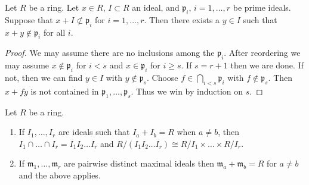 \begin{lemma}
\label{lemma-silly-silly}
Let $R$ be a ring. Let $x \in R$, $I \subset R$ an ideal, and
$\mathfrak p_i$, $i = 1, \ldots, r$ be prime ideals.
Suppose that $x + I \not \subset \mathfrak p_i$ for
$i = 1, \ldots, r$. Then there exists a $y \in I$
such that $x + y \not \in \mathfrak p_i$ for all $i$.
\end{lemma}

\begin{proof}
We may assume there are no inclusions among the $\mathfrak p_i$.
After reordering we may assume $x \not \in \mathfrak p_i$ for $i < s$
and $x \in \mathfrak p_i$ for $i \geq s$. If $s = r + 1$ then we are done.
If not, then we can find $y \in I$ with $y \not \in \mathfrak p_s$.
Choose $f \in \bigcap_{i < s} \mathfrak p_i$ with $f \not \in \mathfrak p_s$.
Then $x + fy$ is not contained in $\mathfrak p_1, \ldots, \mathfrak p_s$.
Thus we win by induction on $s$.
\end{proof}

\begin{lemma}
\label{lemma-chinese-remainder}
Let $R$ be a ring.
\begin{enumerate}
\item If $I_1, \ldots, I_r$ are ideals such that $I_a + I_b = R$
when $a \not = b$, then $I_1 \cap \ldots \cap I_r =
I_1I_2\ldots I_r$ and $R/(I_1I_2\ldots I_r)
\cong R/I_1 \times \ldots \times R/I_r$.
\item If $\mathfrak m_1, \ldots, \mathfrak m_r$ are pairwise distinct maximal
ideals then $\mathfrak m_a + \mathfrak m_b = R$ for $a \not = b$ and the
above applies.
\end{enumerate}
\end{lemma}

